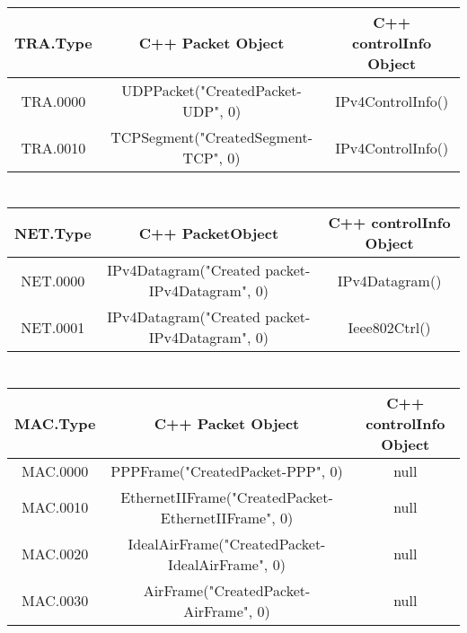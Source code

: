 	\section{}
	\begin{tiny}
		\begin{tabular}{|c|c|c|}
			\hline
			\rowcolor{Gainsboro!60}
			TRA.Type &          C++ Packet Object          & C++ controlInfo Object \\ \hline
			TRA.0000 &  UDPPacket("CreatedPacket-UDP", 0)  &   IPv4ControlInfo()    \\ \hline
			TRA.0010 & TCPSegment("CreatedSegment-TCP", 0) &   IPv4ControlInfo()    \\ \hline
		\end{tabular}
	\end{tiny}
	\section{\glsentryname{layer3}}
	\begin{tiny}
		\begin{tabular}{|c|c|c|}
			\hline
			\rowcolor{Gainsboro!60}
			NET.Type &               C++  PacketObject                & C++ controlInfo Object \\ \hline
			NET.0000 & IPv4Datagram("Created packet-IPv4Datagram", 0) &     IPv4Datagram()     \\ \hline
			NET.0001 & IPv4Datagram("Created packet-IPv4Datagram", 0) &     Ieee802Ctrl()      \\ \hline
		\end{tabular}
	\end{tiny}
	\section{\glsentryname{layer2}}
	\begin{tiny}
		\begin{tabular}{|c|c|c|}
			\hline
			\rowcolor{Gainsboro!60}
			MAC.Type &                  C++ Packet Object                  & C++ controlInfo Object \\ \hline
			MAC.0000 &          PPPFrame("CreatedPacket-PPP", 0)           & null                   \\ \hline
			MAC.0010 & EthernetIIFrame("CreatedPacket-EthernetIIFrame", 0) & null                   \\ \hline
			MAC.0020 &   IdealAirFrame("CreatedPacket-IdealAirFrame", 0)   & null                   \\ \hline
			MAC.0030 &        AirFrame("CreatedPacket-AirFrame", 0)        & null                   \\ \hline
		\end{tabular}
	\end{tiny}